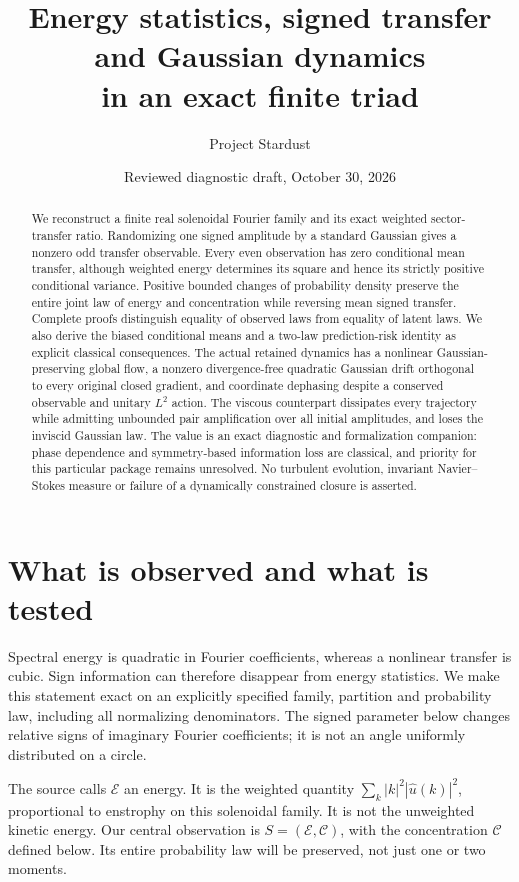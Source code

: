 \documentclass[11pt]{article}
\title{Energy statistics, signed transfer and Gaussian dynamics\protect\\in an exact finite triad}
\author{Project Stardust}
\date{Reviewed diagnostic draft, October 30, 2026}
\begin{document}
\maketitle
\begin{abstract}
We reconstruct a finite real solenoidal Fourier family and its exact
weighted sector-transfer ratio. Randomizing one signed amplitude by a
standard Gaussian gives a nonzero odd transfer observable. Every even
observation has zero conditional mean transfer, although weighted energy
determines its square and hence its strictly positive conditional variance.
Positive bounded changes of probability density preserve the entire joint
law of energy and concentration while reversing mean signed transfer.
Complete proofs distinguish equality of observed laws from equality of
latent laws. We also derive the biased conditional means and a two-law prediction-risk identity as explicit classical consequences. The actual retained dynamics has a nonlinear Gaussian-preserving global flow, a nonzero divergence-free quadratic Gaussian drift orthogonal to every original closed gradient, and coordinate dephasing despite a conserved observable and unitary $L^2$ action. The viscous counterpart dissipates every trajectory while admitting
unbounded pair amplification over all initial amplitudes, and loses
the inviscid Gaussian law. The value
is an exact diagnostic and formalization companion: phase dependence and
symmetry-based information loss are classical, and priority for this
particular package remains unresolved. No turbulent evolution, invariant
Navier--Stokes measure or failure of a dynamically constrained closure is
asserted.
\end{abstract}

\section{What is observed and what is tested}
Spectral energy is quadratic in Fourier coefficients, whereas a nonlinear
transfer is cubic. Sign information can therefore disappear from energy
statistics. We make this statement exact on an explicitly specified family,
partition and probability law, including all normalizing denominators.
The signed parameter below changes relative signs of imaginary Fourier
coefficients; it is not an angle uniformly distributed on a circle.

The source calls $\mathcal E$ an energy. It is the weighted quantity
$\sum_k|k|^2|\widehat u(k)|^2$, proportional to enstrophy on this
solenoidal family. It is not the unweighted kinetic energy. Our central
observation is $S=(\mathcal E,\mathcal C)$, with the concentration
$\mathcal C$ defined below. Its entire probability law will be preserved,
not just one or two moments.
\end{document}
